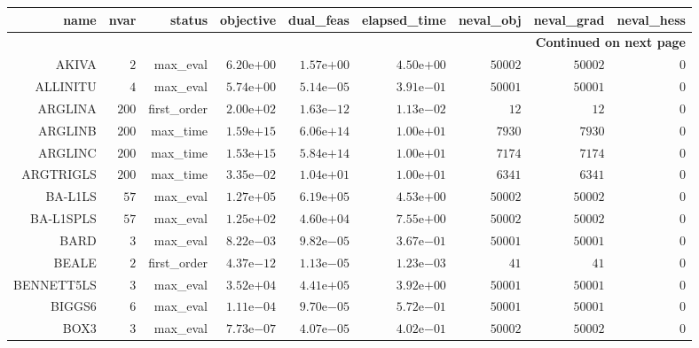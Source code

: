 \begin{longtable}{rrrrrrrrr}
\hline
name & nvar & status & objective & dual\_feas & elapsed\_time & neval\_obj & neval\_grad & neval\_hess \\\hline
\endhead
\hline
\multicolumn{9}{r}{{\bfseries Continued on next page}}\\
\hline
\endfoot
\endlastfoot
AKIVA & \(     2\) & max\_eval & \( 6.20\)e\(+00\) & \( 1.57\)e\(+00\) & \( 4.50\)e\(+00\) & \( 50002\) & \( 50002\) & \(     0\) \\
ALLINITU & \(     4\) & max\_eval & \( 5.74\)e\(+00\) & \( 5.14\)e\(-05\) & \( 3.91\)e\(-01\) & \( 50001\) & \( 50001\) & \(     0\) \\
ARGLINA & \(   200\) & first\_order & \( 2.00\)e\(+02\) & \( 1.63\)e\(-12\) & \( 1.13\)e\(-02\) & \(    12\) & \(    12\) & \(     0\) \\
ARGLINB & \(   200\) & max\_time & \( 1.59\)e\(+15\) & \( 6.06\)e\(+14\) & \( 1.00\)e\(+01\) & \(  7930\) & \(  7930\) & \(     0\) \\
ARGLINC & \(   200\) & max\_time & \( 1.53\)e\(+15\) & \( 5.84\)e\(+14\) & \( 1.00\)e\(+01\) & \(  7174\) & \(  7174\) & \(     0\) \\
ARGTRIGLS & \(   200\) & max\_time & \( 3.35\)e\(-02\) & \( 1.04\)e\(+01\) & \( 1.00\)e\(+01\) & \(  6341\) & \(  6341\) & \(     0\) \\
BA-L1LS & \(    57\) & max\_eval & \( 1.27\)e\(+05\) & \( 6.19\)e\(+05\) & \( 4.53\)e\(+00\) & \( 50002\) & \( 50002\) & \(     0\) \\
BA-L1SPLS & \(    57\) & max\_eval & \( 1.25\)e\(+02\) & \( 4.60\)e\(+04\) & \( 7.55\)e\(+00\) & \( 50002\) & \( 50002\) & \(     0\) \\
BARD & \(     3\) & max\_eval & \( 8.22\)e\(-03\) & \( 9.82\)e\(-05\) & \( 3.67\)e\(-01\) & \( 50001\) & \( 50001\) & \(     0\) \\
BEALE & \(     2\) & first\_order & \( 4.37\)e\(-12\) & \( 1.13\)e\(-05\) & \( 1.23\)e\(-03\) & \(    41\) & \(    41\) & \(     0\) \\
BENNETT5LS & \(     3\) & max\_eval & \( 3.52\)e\(+04\) & \( 4.41\)e\(+05\) & \( 3.92\)e\(+00\) & \( 50001\) & \( 50001\) & \(     0\) \\
BIGGS6 & \(     6\) & max\_eval & \( 1.11\)e\(-04\) & \( 9.70\)e\(-05\) & \( 5.72\)e\(-01\) & \( 50001\) & \( 50001\) & \(     0\) \\
BOX3 & \(     3\) & max\_eval & \( 7.73\)e\(-07\) & \( 4.07\)e\(-05\) & \( 4.02\)e\(-01\) & \( 50002\) & \( 50002\) & \(     0\) \\

\end{longtable}
